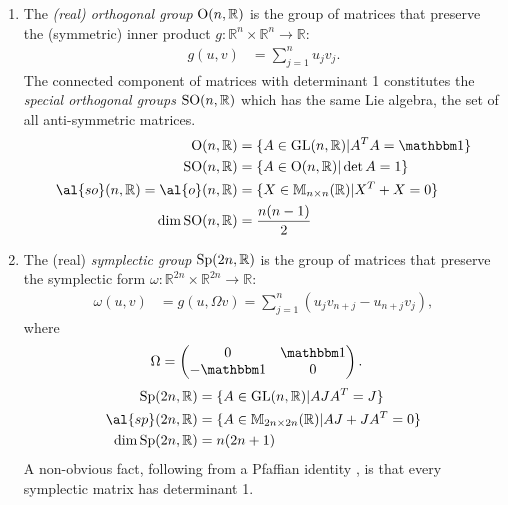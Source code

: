 \begin{enumerate}
	\item The \emph{(real) orthogonal group} $\text{O}(n,\mathbb{R})$ is the group of matrices that preserve the (symmetric) inner product $ g :\mathbb{R}^{n} \times \mathbb{R}^{n} \to \mathbb{R}$:
	\begin{align}
	g(u,v) &= \sum_{j=1}^{n} u_j v_j.
	\end{align}
	The connected component of matrices with determinant 1 constitutes the \emph{special orthogonal groups} $\text{SO}(n,\mathbb{R})$ which has the same Lie algebra, the set of all anti-symmetric matrices.
	\begin{align}
	\gr{O}{n,\mathbb{R}} &= \{ A \in \gr{GL}{n,\mathbb{R}} | A^T A = \id \} \\
	\gr{SO}{n,\mathbb{R}} &= \{ A \in \gr{O}{n,\mathbb{R}} | \det A = 1 \} \\
	\al{so}(n,\mathbb{R}) = \al{o}(n,\mathbb{R}) &= \{ X \in \mat{n}{n} | X^T + X = 0 \} \\
	\dim \gr{SO}{n,\mathbb{R}} &= \frac{n(n-1)}{2}
	\end{align}
	
	\item The (real) \emph{symplectic group} $\text{Sp}(2n,\mathbb{R})$ is the group of matrices that preserve the symplectic form $\omega :\mathbb{R}^{2n} \times \mathbb{R}^{2n} \to \mathbb{R}$:
	\begin{align}
	\omega(u,v) &= g(u,\Omega v) = \sum_{j=1}^{n} \left( u_j v_{n+j} - u_{n+j} v_j \right),
	\end{align}
	where
	\begin{align}
	\Omega &= \begin{pmatrix}
	{\huge 0} & \id \\
	-\id & {\huge 0}
	\end{pmatrix}.
	\end{align}
	\begin{align}
	\gr{Sp}{2n,\mathbb{R}} &= \{ A \in \gr{GL}{n,\mathbb{R}} | AJA^T = J \} \\
	\al{sp}(2n,\mathbb{R}) &= \{ A \in \mat{2n}{2n} | AJ + JA^T  = 0 \} \\
	\dim \gr{Sp}{2n,\mathbb{R}} &= n(2n+1)
	\end{align}
	A non-obvious fact, following from a Pfaffian identity \cite[p.119]{Procesi}, is that every symplectic matrix has determinant 1.
	
\end{enumerate}

